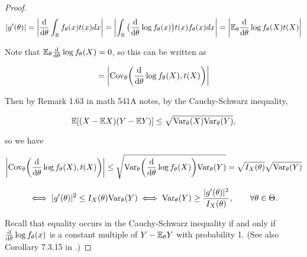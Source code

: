 \begin{proof}

\[
|g'(\theta)| = \left| \deriv{}{\theta} \int_{\mathbb{R}} f_\theta(x) t(x) dx \right| = \left|  \int_{\mathbb{R}} \big( \deriv{}{\theta} \log f_\theta(x) \big) t(x) f_\theta(x) dx \right| = \left| \E_\theta \deriv{}{\theta} \log f_\theta(X)t(X) \right|
\]

Note that \(\E_\theta \deriv{}{\theta} \log f_\theta(X) = 0\), so this can be written as 

\[
 = \left| \Cov_\theta \bigg(\deriv{}{\theta} \log f_\theta(X), t(X) \bigg) \right|
\]

Then by Remark 1.63 in math 541A notes, by the Cauchy-Schwarz inequality,

\[
\E[ (X - \E X)(Y - \E Y) ] \leq \sqrt{ \Var_\theta(X) \Var_\theta(Y)},
\]

so we have

\[
 \left| \Cov_\theta \bigg(\deriv{}{\theta} \log f_\theta(X), t(X) \bigg) \right| \leq \sqrt{ \Var_\theta \bigg( \deriv{}{\theta} \log f_\theta(X) \bigg) \Var_\theta(Y) } = \sqrt{I_X(\theta)} \sqrt{\Var_\theta(Y)}
\]

\[
\iff |g'(\theta)| ^2 \leq I_X(\theta) \Var_\theta(Y) \iff \Var_\theta(Y) \geq \frac{ |g'(\theta)|^2}{I_X(\theta)}, \qquad \forall \theta \in \Theta.
\]

Recall that equality occurs in the Cauchy-Schwarz inequality if and only if \(\deriv{}{\theta} \log f_\theta(x) \) is a constant multiple of \(Y - \E_\theta Y\)  with probability 1. (See also Corollary 7.3.15 in \citet[p. 341]{CaseBerg:01}.)

\end{proof}

